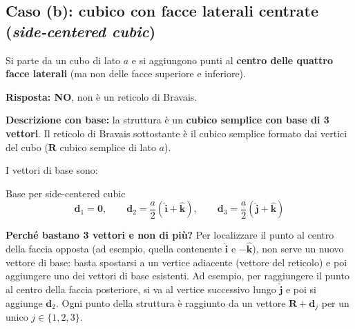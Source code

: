 \subsection*{Caso (b): cubico con facce laterali centrate (\textit{side-centered cubic})}

Si parte da un cubo di lato $a$ e si aggiungono punti al \textbf{centro delle quattro facce laterali} (ma non delle facce superiore e inferiore).

\textbf{Risposta: NO}, non è un reticolo di Bravais.

\textbf{Descrizione con base:} la struttura è un \textbf{cubico semplice con base di 3 vettori}. Il reticolo di Bravais sottostante è il cubico semplice formato dai vertici del cubo ($\mathbf{R}$ cubico semplice di lato $a$).

I vettori di base sono:

\begin{equazione}{Base per side-centered cubic}
\begin{equation}
\mathbf{d}_1 = \mathbf{0}, \qquad \mathbf{d}_2 = \frac{a}{2}(\hat{\mathbf{i}} + \hat{\mathbf{k}}), \qquad \mathbf{d}_3 = \frac{a}{2}(\hat{\mathbf{j}} + \hat{\mathbf{k}})
\end{equation}
\end{equazione}

\textbf{Perché bastano 3 vettori e non di più?} Per localizzare il punto al centro della faccia opposta (ad esempio, quella contenente $\hat{\mathbf{i}}$ e $-\hat{\mathbf{k}}$), non serve un nuovo vettore di base: basta spostarsi a un vertice adiacente (vettore del reticolo) e poi aggiungere uno dei vettori di base esistenti. Ad esempio, per raggiungere il punto al centro della faccia posteriore, si va al vertice successivo lungo $\hat{\mathbf{j}}$ e poi si aggiunge $\mathbf{d}_2$. Ogni punto della struttura è raggiunto da un vettore $\mathbf{R} + \mathbf{d}_j$ per un unico $j \in \{1, 2, 3\}$.

